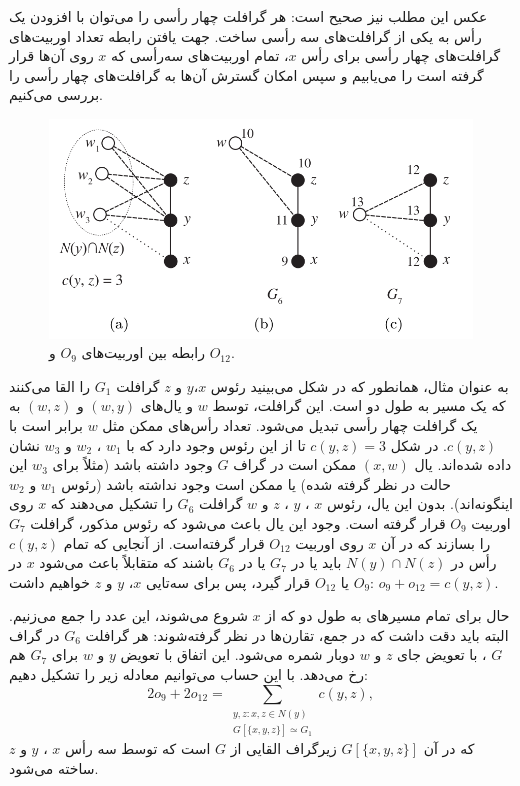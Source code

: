 عکس این مطلب نیز صحیح است: هر گرافلت چهار رأسی را می‌توان با افزودن یک رأس به یکی از گرافلت‌های سه رأسی ساخت. جهت یافتن رابطه تعداد اوربیت‌های گرافلت‌های چهار رأسی برای رأس $x$، تمام اوربیت‌های سه‌رأسی که $x$ روی آن‌ها قرار گرفته است را می‌یابیم و سپس امکان گسترش آن‌ها به گرافلت‌های چهار رأسی را بررسی می‌کنیم.

\begin{figure}[ht]
\centering
\includegraphics[scale=0.3]{./4-node-graphlet-1.png}
\caption{رابطه بین اوربیت‌های $O_9$ و $O_{12}$.}
\label{fig:o9-o12-relation}
\end{figure}

به عنوان مثال، همانطور که در شکل  می‌بینید رئوس $x$،$y$ و $z$ گرافلت $G_1$ را القا می‌کنند که یک مسیر به طول دو است. این گرافلت، توسط $w$ و یال‌های $(w,y)$ و $(w,z)$ به یک گرافلت چهار رأسی تبدیل می‌شود. تعداد رأس‌های ممکن مثل $w$ برابر است با $c(y,z)$. در شکل $c(y,z) = 3$ تا از این رئوس وجود دارد که با $w_1$ ، $w_2$ و $w_3$ نشان داده شده‌اند. یال $(x,w)$ ممکن است در گراف $G$ وجود داشته باشد (مثلاً برای $w_3$ این حالت در نظر گرفته شده) یا ممکن است وجود نداشته باشد (رئوس $w_1$ و $w_2$ اینگونه‌اند). بدون این یال، رئوس $x$ ، $y$ ، $z$ و $w$ گرافلت $G_6$ را تشکیل می‌دهند که $x$ روی اوربیت $O_9$ قرار گرفته است. وجود این یال باعث می‌شود که رئوس مذکور، گرافلت $G_7$ را بسازند که در آن $x$ روی اوربیت $O_{12}$ قرار گرفته‌است. از آنجایی که تمام $c(y,z)$ رأس در $N(y) \cap N(z)$ باید یا در $G_7$ یا در $G_6$ باشند که متقابلاً باعث می‌شود $x$ در $O_9$ یا $O_{12}$ قرار گیرد، پس برای سه‌تایی $x$، $y$ و $z$ خواهیم داشت: $o_9 + o_{12} = c(y,z)$.

حال برای تمام مسیرهای به طول دو که از $x$ شروع می‌شوند، این عدد را جمع می‌زنیم. البته باید دقت داشت که در جمع، تقارن‌ها در نظر گرفته‌شوند: هر گرافلت $G_6$  در گراف $G$ ، با تعویض جای $z$ و $w$ دوبار شمره می‌شود. این اتفاق با تعویض $y$‌ و $w$ برای $G_7$ هم رخ می‌دهد. با این حساب می‌توانیم معادله زیر را تشکیل دهیم:
\begin{equation*}
2o_9+2o_{12} = \sum_{\substack{y,z: x,z\in N(y)\\G[\{x,y,z\}] \simeq G_1 }}c(y,z),
\end{equation*}
که در آن $G[\{x,y,z\}]$ زیرگراف القایی از $G$ است که توسط سه رأس $x$ ، $y$ و $z$ ساخته می‌شود.

